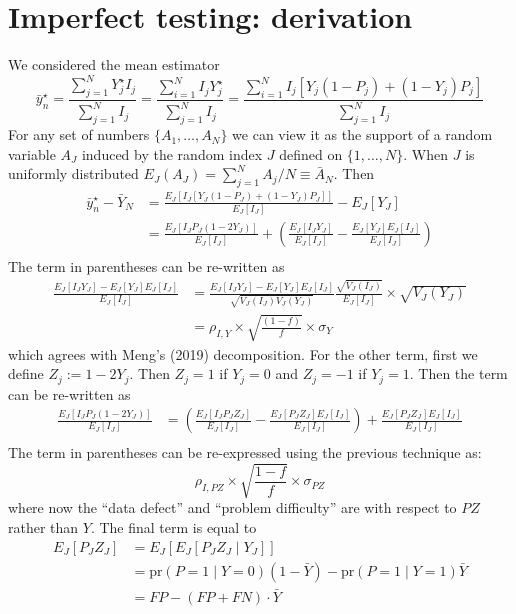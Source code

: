 \documentclass[aoas]{amsart}
\def\pr{\text{pr}}
\begin{document}
\section{Imperfect testing: derivation}
\label{app:imperfect}
We considered the mean estimator
$$
\bar y_n^\star = \frac{\sum_{j=1}^N Y_j^\star I_j}{\sum_{j=1}^N I_j} = \frac{\sum_{i=1}^N  I_j Y_j^\star }{\sum_{j=1}^N  I_j } = \frac{\sum_{i=1}^N  I_j \left[ Y_j (1-P_j) + (1-Y_j) P_j \right]}{\sum_{j=1}^N  I_j }
$$
For any set of numbers $\{ A_1, \ldots, A_N \}$ we can view it as the support of a random variable $A_J$ induced by the random index $J$ defined on $\{1,\ldots, N\}$.  When $J$ is uniformly distributed $E_J (A_J) = \sum_{j=1}^N A_j / N \equiv \bar A_N$. Then
$$
\begin{aligned}
\bar y_n^\star  - \bar Y_N &= \frac{E_J \left[ I_J \left[ Y_J (1-P_J) + (1-Y_J) P_J \right] \right]}{E_J [ I_J ] } - E_J[Y_J] \\
&= \frac{E_J \left[ I_J P_J (1-2Y_J) \right]}{E_J [ I_J ] } + \left( \frac{E_J [I_J Y_J]}{E_J [ I_J ] } - \frac{E_J[Y_J] E_J[I_J]}{E_J[I_J]} \right) \\
\end{aligned}
$$
The term in parentheses can be re-written as
$$
\begin{aligned}
\frac{E_J [I_J Y_J]- E_J[Y_J] E_J[I_J]}{E_J[I_J]} &=  \frac{E_J [I_J Y_J]- E_J[Y_J] E_J[I_J]}{\sqrt{V_J(I_J) V_J(Y_J)}} \frac{\sqrt{V_J(I_J)}}{E_J[I_J]} \times \sqrt{V_J(Y_J)} \\
&= \rho_{I,Y} \times \sqrt{\frac{(1-f)}{f}} \times \sigma_Y
\end{aligned}
$$
which agrees with Meng's (2019) decomposition. For the other term, first we define $Z_j := 1 - 2 Y_j $. Then $Z_j = 1$ if $Y_j = 0$ and $Z_j = -1$ if $Y_j = 1$. Then the term can be re-written as
$$
\begin{aligned}
\frac{E_J \left[ I_J P_J (1-2Y_J) \right]}{E_J [ I_J ] } &= \left( \frac{E_J \left[ I_J P_J Z_J \right]}{E_J [ I_J ] } -  \frac{E_J \left[ P_J Z_J \right] E_J[ I_J]}{E_J [ I_J ] } \right) +  \frac{E_J \left[ P_J Z_J \right] E_J[ I_J]}{E_J [ I_J ] } \\
\end{aligned}
$$
The term in parentheses can be re-expressed using the previous technique as:
$$
\rho_{I, PZ} \times \sqrt{\frac{1-f}{f}} \times \sigma_{PZ}
$$
where now the ``data defect'' and ``problem difficulty'' are with respect to $PZ$ rather than $Y$. The final term is equal to
$$
\begin{aligned}
E_J [P_J Z_J ] &= E_J [ E_J [ P_J Z_J \mid Y_J ] ] \\
&= \pr (P = 1 \mid Y = 0) (1-\bar Y) - \pr(P=1 \mid Y = 1) \bar Y \\
&= FP - (FP + FN) \cdot \bar Y
\end{aligned}
$$
\end{document}

